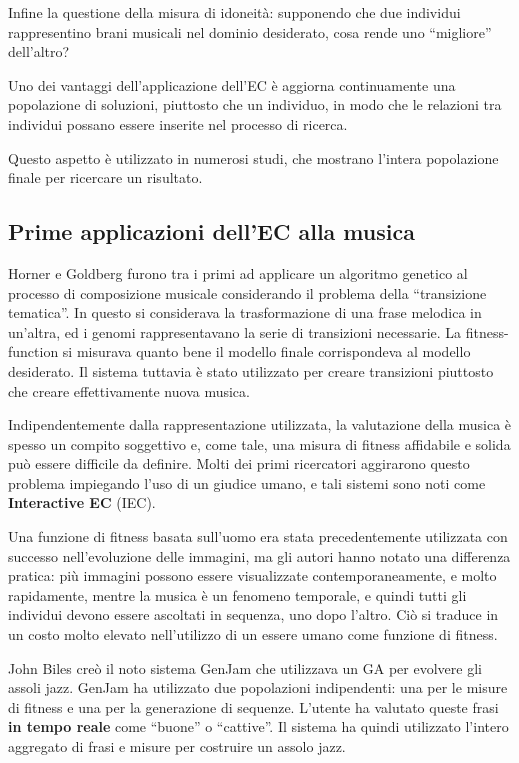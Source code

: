 \documentclass[a4paper,12pt]{report}
\begin{document}
Infine la questione della misura di idoneità: supponendo che due individui rappresentino brani musicali nel dominio desiderato, cosa rende uno “migliore” dell’altro? 

Uno dei vantaggi dell'applicazione dell'EC è aggiorna continuamente una popolazione di soluzioni, piuttosto che un individuo, in modo che le relazioni tra individui possano essere inserite nel processo di ricerca. 

Questo aspetto è utilizzato in numerosi studi, che mostrano l'intera popolazione finale per ricercare un risultato. 

\subsection{Prime applicazioni dell'EC alla musica}

Horner e Goldberg furono tra i primi ad applicare un algoritmo genetico al processo di composizione musicale considerando il problema della “transizione tematica”. 
In questo si considerava la trasformazione di una frase melodica in un'altra, ed i genomi rappresentavano la serie di transizioni necessarie. 
La fitness-function si misurava quanto bene il modello finale corrispondeva al modello desiderato. 
Il sistema tuttavia è stato utilizzato per creare transizioni piuttosto che creare effettivamente nuova musica. 

Indipendentemente dalla rappresentazione utilizzata, la valutazione della musica è spesso un compito soggettivo e, come tale, una misura di fitness affidabile e solida può essere difficile da definire. 
Molti dei primi ricercatori aggirarono questo problema impiegando l'uso di un giudice umano, e tali sistemi sono noti come \textbf{Interactive EC} (IEC). 

Una funzione di fitness basata sull’uomo era stata precedentemente utilizzata con successo nell’evoluzione delle immagini, 
ma gli autori hanno notato una differenza pratica: più immagini possono essere visualizzate contemporaneamente, e molto rapidamente, 
mentre la musica è un fenomeno temporale, e quindi tutti gli individui devono essere ascoltati in sequenza, uno dopo l'altro. 
Ciò si traduce in un costo molto elevato nell’utilizzo di un essere umano come funzione di fitness.

John Biles creò il noto sistema GenJam che utilizzava un GA per evolvere gli assoli jazz. 
GenJam ha utilizzato due popolazioni indipendenti: una per le misure di fitness e una per la generazione di sequenze. 
L’utente ha valutato queste frasi \textbf{in tempo reale} come “buone” o “cattive”. 
Il sistema ha quindi utilizzato l'intero aggregato di frasi e misure per costruire un assolo jazz. 
\end{document}
